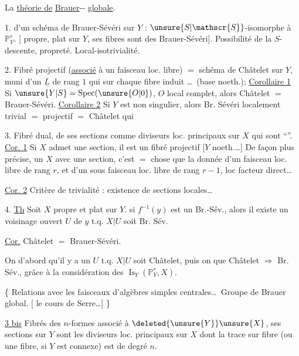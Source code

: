 La \uline{théorie de} \uline{Brauer}-\uline{}-\uline{} \uline{globale}.

1.  d'un schéma de Brauer-Sévéri sur $Y$ :  $\unsure{S|\mathscr{S}}$-isomorphe à $\mathbb{P}^{r}_{Y}$.  [ propre, plat sur $Y$, ses fibres sont des Brauer-Sévéri]. Possibilité de la $S$-descente, propreté. Local-isotrivialité.

2. Fibré projectif (\uline{associé} à un faisceau loc. libre) $=$ schéma de Châtelet sur $Y$,  muni d'un $\underline{L}$ de rang $1$ qui sur chaque fibre induit \ldots\ (base noeth.); \uline{Corollaire 1} Si $\unsure{Y|S}=\operatorname{Spec}(\unsure{O|0})$, $O$ local complet, alors Châtelet $=$ Brauer-Sévéri. \uline{Corollaire 2} Si $Y$ est non singulier, alors Br. Sévéri localement trivial $=$  projectif $=$ Châtelet qui  

3. Fibré dual,  de ses sections comme diviseurs loc. principaux sur $X$ qui sont ``''. \uline{Cor. 1} Si $X$ admet une section, il est un fibré projectif [$Y$ noeth.\ldots] De façon plus précise, un $X$  avec une section, c'est  $=$ chose que la donnée d'un  faisceau loc. libre de rang $r$, et d'un sous faisceau loc. libre de rang $r-1$, loc facteur direct\ldots

\uline{Cor. 2}  Critère de  trivialité : existence de sections locales\ldots

4. \uline{Th} Soit $X$ propre et plat sur $Y$.  si $f^{-1}(y)$ est un Br.-Sév., alors il existe un voisinage ouvert $U$ de $y$ t.q. $X|U$ soit Br. Sév.

\uline{Cor.} Châtelet $=$ Brauer-Sévéri.

On  d'abord qu'il y a un $U$ t.q. $X|U$ soit Châtelet, puis on   que Châtelet $\Rightarrow$ Br. Sév., grâce à la considération des $\operatorname{Is}_{Y}(\mathbb{P}^{r}_{Y},X)$.

\{ Relations avec les faisceaux d'algèbres simples centrales\ldots\ Groupe de Brauer global. [ le cours de Serre\ldots] \}

\uline{3 bis} Fibrés des $n$-formes associé à $\deleted{\unsure{Y}}\unsure{X}$, ses sections sur $Y$ sont les diviseurs loc. principaux sur $X$ dont la trace sur  fibre (ou une fibre, si $Y$ est connexe) est de degré $n$.
